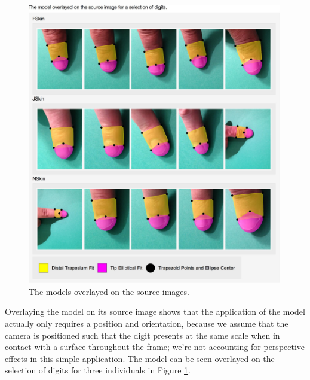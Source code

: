 \begin{figure}[h!]
  \centering
    \includegraphics[width=0.99\textwidth]{Chapter4/Figs/Model_Overlayed.jpg}
    \caption{The models overlayed on the source images.}\label{fig:FingertipModelResult}
\end{figure}

Overlaying the model on its source image shows that the application of the model actually only requires a position and orientation, because we assume that the camera is positioned such that the digit presents at the same scale when in contact with a surface throughout the frame; we're not accounting for perspective effects in this simple application.
The model can be seen overlayed on the selection of digits for three individuals in Figure \ref{fig:FingertipModelResult}.


